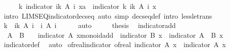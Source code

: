\begin{isabellebody}
%
\isadelimproof
%
\endisadelimproof
%
\isatagproof
{}\isamarkupfalse%
\ {\isacharminus}\isanewline
\ \ \isamarkupfalse%
\ {\isachardoublequoteopen}{\isacharparenleft}{\isasymlambda}k{\isachardot}\ indicator\ {\isacharparenleft}{\isasymInter}i{\isacharless}k{\isachardot}\ A\ i{\isacharparenright}\ x{\isacharcolon}{\isacharcolon}{\isacharprime}a{\isacharparenright}\ {\isacharminus}{\isacharminus}{\isacharminus}{\isacharminus}{\isachargreater}\ indicator\ {\isacharparenleft}{\isasymInter}k{\isachardot}\ {\isasymInter}i{\isacharless}k{\isachardot}\ A\ i{\isacharparenright}\ x{\isachardoublequoteclose}\isanewline
\ \ \ \ \isamarkupfalse%
\ {\isacharparenleft}intro\ LIMSEQ{\isacharunderscore}indicator{\isacharunderscore}decseq{\isacharparenright}\ {\isacharparenleft}auto\ simp{\isacharcolon}\ decseq{\isacharunderscore}def\ intro{\isacharcolon}\ less{\isacharunderscore}le{\isacharunderscore}trans{\isacharparenright}\isanewline
\ \ \isamarkupfalse%
\ \isamarkupfalse%
\ {\isachardoublequoteopen}{\isacharparenleft}{\isasymInter}k{\isachardot}\ {\isasymInter}\ i{\isacharless}k{\isachardot}\ A\ i{\isacharparenright}\ {\isacharequal}\ {\isacharparenleft}{\isasymInter}i{\isachardot}\ A\ i{\isacharparenright}{\isachardoublequoteclose}\isanewline
\ \ \ \ \isamarkupfalse%
\ auto\isanewline
\ \ \isamarkupfalse%
\ \isamarkupfalse%
\ {\isacharquery}thesis\ \isacommand{{\isachardot}}\isamarkupfalse%
\isanewline
{}\isamarkupfalse%
%
\endisatagproof
{\isafoldproof}%
%
\isadelimproof
\isanewline
%
\endisadelimproof
\isanewline
{}\isamarkupfalse%
\ indicator{\isacharunderscore}add{\isacharcolon}\isanewline
\ \ {\isachardoublequoteopen}A\ {\isasyminter}\ B\ {\isacharequal}\ {\isacharbraceleft}{\isacharbraceright}\ {\isasymLongrightarrow}\ {\isacharparenleft}indicator\ A\ x{\isacharcolon}{\isacharcolon}{\isacharunderscore}{\isacharcolon}{\isacharcolon}monoid{\isacharunderscore}add{\isacharparenright}\ {\isacharplus}\ indicator\ B\ x\ {\isacharequal}\ indicator\ {\isacharparenleft}A\ {\isasymunion}\ B{\isacharparenright}\ x{\isachardoublequoteclose}\isanewline
%
\isadelimproof
\ \ %
\endisadelimproof
%
\isatagproof
{}\isamarkupfalse%
\ indicator{\isacharunderscore}def\ \isamarkupfalse%
\ auto%
\endisatagproof
{\isafoldproof}%
%
\isadelimproof
\isanewline
%
\endisadelimproof
\isanewline
{}\isamarkupfalse%
\ of{\isacharunderscore}real{\isacharunderscore}indicator{\isacharcolon}\ {\isachardoublequoteopen}of{\isacharunderscore}real\ {\isacharparenleft}indicator\ A\ x{\isacharparenright}\ {\isacharequal}\ indicator\ A\ x{\isachardoublequoteclose}\isanewline

\end{isabellebody}
